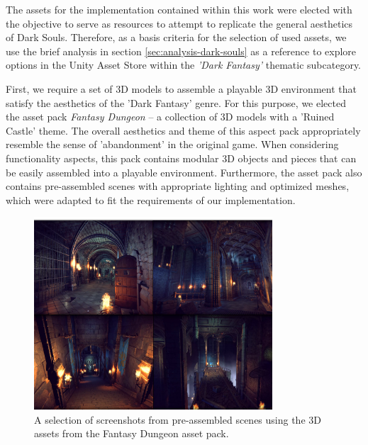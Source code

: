 The assets for the implementation contained within this work were elected with the objective to serve as resources to attempt to replicate the general aesthetics of Dark Souls. Therefore, as a basis criteria for the selection of used assets, we use the brief analysis in section \ref{sec:analysis-dark-souls} as a reference to explore options in the Unity Asset Store within the \emph{'Dark Fantasy'} thematic subcategory.

First, we require a set of 3D models to assemble a playable 3D environment that satisfy the aesthetics of the 'Dark Fantasy' genre. For this purpose, we elected the asset pack \emph{Fantasy Dungeon} -- a collection of 3D models with a 'Ruined Castle' theme. The overall aesthetics and theme of this aspect pack appropriately resemble the sense of 'abandonment' in the original game. When considering functionality aspects, this pack contains modular 3D objects and pieces that can be easily assembled into a playable environment. Furthermore, the asset pack also contains pre-assembled scenes with appropriate lighting and optimized meshes, which were adapted to fit the requirements of our implementation.

\begin{figure}
    \caption{A selection of screenshots from pre-assembled scenes using the 3D assets from the Fantasy Dungeon asset pack.}
    \begin{center}
        \includegraphics[width=24em]{figures/fig-environment-assets.png}
    \end{center}
    \label{fig:environment-assets}
\end{figure}

